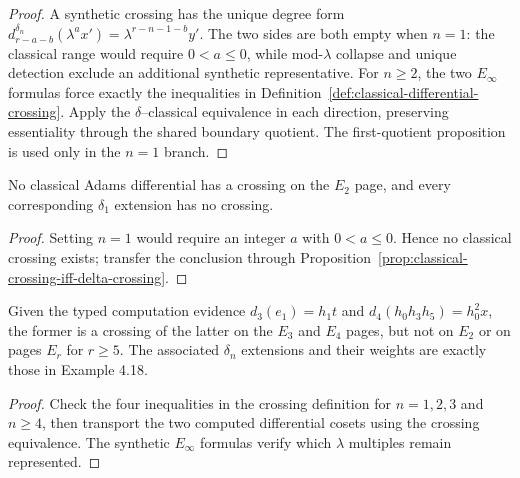 \begin{proof}
  A synthetic crossing has the unique degree form
  $d_{r-a-b}^{\delta_n}(\lambda^a x')=\lambda^{r-n-1-b}y'$.  The two
  sides are both empty when $n=1$: the classical range would require
  $0<a\le0$, while mod-$\lambda$ collapse and unique detection exclude an
  additional synthetic representative.  For $n\ge2$, the two $E_\infty$
  formulas force exactly the inequalities in
  Definition~\ref{def:classical-differential-crossing}.  Apply the
  $\delta$--classical equivalence in each direction, preserving essentiality
  through the shared boundary quotient.  The first-quotient proposition is
  used only in the $n=1$ branch.
\end{proof}

\begin{corollary}
  \label{cor:classical-e2-no-crossing}
  \notready
  No classical Adams differential has a crossing on the $E_2$ page, and every
  corresponding $\delta_1$ extension has no crossing.
\end{corollary}

\begin{proof}
  Setting $n=1$ would require an integer $a$ with $0<a\le0$.  Hence no
  classical crossing exists; transfer the conclusion through
  Proposition~\ref{prop:classical-crossing-iff-delta-crossing}.
\end{proof}

\begin{proposition}
  \label{prop:stem38-crossing-regression}
  \notready
  Given the typed computation evidence
  $d_3(e_1)=h_1t$ and
  $d_4(h_0h_3h_5)=h_0^2x$, the former is a crossing of the latter on the
  $E_3$ and $E_4$ pages, but not on $E_2$ or on pages $E_r$ for $r\ge5$.
  The associated $\delta_n$ extensions and their weights are exactly those in
  Example 4.18.
\end{proposition}

\begin{proof}
  Check the four inequalities in the crossing definition for $n=1,2,3$ and
  $n\ge4$, then transport the two computed differential cosets using the
  crossing equivalence.  The synthetic $E_\infty$ formulas verify which
  $\lambda$ multiples remain represented.
\end{proof}

